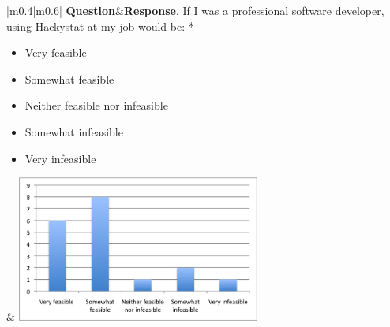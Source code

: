 \documentclass[11pt]{article}
\begin{document}
\begin{center}
\footnotesize
\begin{longtable}{|m{}|m{}|}
\hline 
{\bf Question}&{\bf Response}\endhead {}. If I was a professional software developer, using Hackystat at my job would be: *
\begin{itemize}
\item Very feasible
\item Somewhat feasible
\item Neither feasible nor infeasible
\item Somewhat infeasible
\item Very infeasible
\end{itemize}
&
\includegraphics[width=0.6\textwidth]{Q16-FuturePredict} \\ \hline

\end{longtable}
\end{center}
\end{document}
